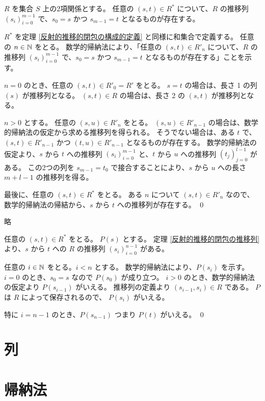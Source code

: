 \begin{jtheorem}[反射的推移的閉包の推移列]
  \label{反射的推移的閉包の推移列}
  $R$ を集合 $S$ 上の2項関係とする。
  任意の $(s, t) \in R^*$ について、$R$ の推移列 $(s_i)_{i=0}^{m-1}$ で、$s_0 = s$ かつ $s_{m-1} = t$ となるものが存在する。
\end{jtheorem}
\begin{jproof}
  $R^*$ を定理 \ref{反射的推移的閉包の構成的定義} と同様に和集合で定義する。
  任意の $n \in \mathbb{N}$ をとる。
  数学的帰納法により、「任意の $(s, t) \in R'_n$ について、$R$ の推移列 $(s_i)_{i=0}^{m-1}$ で、$s_0 = s$ かつ $s_{m-1} = t$ となるものが存在する」ことを示す。

  $n = 0$ のとき、任意の $(s, t) \in R'_0 = R'$ をとる。
  $s = t$ の場合は、長さ 1 の列 $(s)$ が推移列となる。
  $(s, t) \in R$ の場合は、長さ 2 の $(s, t)$ が推移列となる。

  $n > 0$ とする。
  任意の $(s, u) \in R'_n$ をとる。
  $(s, u) \in R'_{n-1}$ の場合は、数学的帰納法の仮定から求める推移列を得られる。
  そうでない場合は、ある $t$ で、$(s, t) \in R'_{n-1}$ かつ $(t, u) \in R'_{n-1}$ となるものが存在する。
  数学的帰納法の仮定より、$s$ から $t$ への推移列 $(s_i)_{i=0}^{m-1}$ と、$t$ から $u$ への推移列 $(t_j)_{j=0}^{l-1}$ がある。
  この2つの列を $s_{m-1} = t_0$ で接合することにより、$s$ から $u$ への長さ $m + l - 1$ の推移列を得る。

  最後に、任意の $(s, t) \in R^*$ をとる。
  ある $n$ について $(s, t) \in R'_n$ なので、数学的帰納法の帰結から、$s$ から $t$ への推移列が存在する。
  \qed
\end{jproof}

\begin{jexercise*}[2.2.8]
  略
\end{jexercise*}
\begin{jproof}
  任意の $(s, t) \in R^*$ をとる。
  $P(s)$ とする。
  定理 \ref{反射的推移的閉包の推移列} より、$s$ から $t$ への $R$ の推移列 $(s_i)_{i=0}^{n-1}$ がある。

  任意の $i \in \mathbb{N}$ をとる。$i < n$ とする。
  数学的帰納法により、$P(s_i)$ を示す。
  $i = 0$ のとき、$s_0 = s$ なので $P(s_0)$ が成り立つ。
  $i > 0$ のとき、数学的帰納法の仮定より $P(s_{i-1})$ がいえる。
  推移列の定義より $(s_{i-1}, s_i) \in R$ である。
  $P$ は $R$ によって保存されるので、 $P(s_i)$ がいえる。

  特に $i = n - 1$ のとき、$P(s_{n-1})$ つまり $P(t)$ がいえる。
  \qed
\end{jproof}

\section{列}

\section{帰納法}
